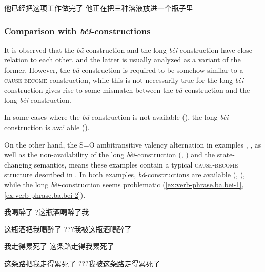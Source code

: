 \documentclass[UTF8, a4paper, oneside, scheme=plain, 12pt]{ctexrep}
\newcommand{\form}[1]{\emph{#1}}
\newcommand*{\category}[1]{\textsc{#1}}
\begin{document}
\begin{exe}
    \ex 他已经把这项工作做完了
    \ex 他正在把三种溶液放进一个瓶子里
\end{exe}

\subsubsection{Comparison with \form{bèi}-constructions}

It is observed that the \form{bǎ}-construction
and the long \form{bèi}-construction
have close relation to each other, 
and the latter is usually analyzed 
as a variant of the former.
However, the \form{bǎ}-construction
is required to be somehow similar to a \category{cause}-\category{become} construction,
while this is not necessarily true for the long \form{bèi}-construction
gives rise to some mismatch between the \form{bǎ}-construction
and the long \form{bèi}-construction.

In some cases where the \form{bǎ}-construction is not available 
(),
the long \form{bèi}-construction is available
().

On the other hand,
the S=O ambitransitive valency alternation 
in examples , ,
as well as the non-availability of the long \form{bèi}-construction
(, )
and the state-changing semantics,
means these examples contain a typical \category{cause}-\category{become} structure 
described in .
In both examples, 
\form{bǎ}-constructions are available 
(, ),
while the long \form{bèi}-construction 
seems problematic 
(\ref{ex:verb-phrase.ba.bei-1}, \ref{ex:verb-phrase.ba.bei-2}).

\begin{exe}
    \ex\label{ex:verb-phrase.ba.cause.1} \begin{xlist}
        \ex 我喝醉了
        \ex ?这瓶酒喝醉了我
    \end{xlist}
    \ex\label{ex:verb-phrase.ba.ba-1} 这瓶酒把我喝醉了
    \ex\label{ex:verb-phrase.ba.bei-1} ???我被这瓶酒喝醉了
\end{exe}

\begin{exe}
    \ex\label{ex:verb-phrase.ba.cause.2} \begin{xlist}
        \ex 我走得累死了
        \ex 这条路走得我累死了
    \end{xlist}
    \ex\label{ex:verb-phrase.ba.ba-2} 这条路把我走得累死了
    \ex\label{ex:verb-phrase.ba.bei-2} ???我被这条路走得累死了
\end{exe}
\end{document}
